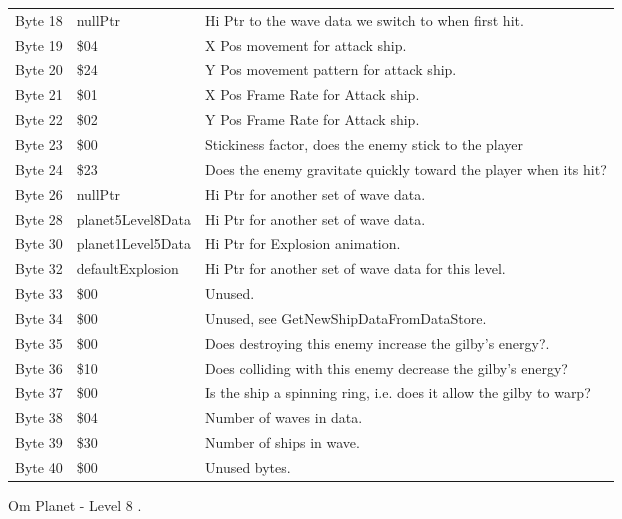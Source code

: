 \begin{figure}[H]
{\begin{adjustbox}{width=12cm}
\begin{tabular}{lll}
 Byte 18 & nullPtr           & Hi Ptr to the wave data we switch to when first hit.               \\
 Byte 19 & \$04               & X Pos movement for attack ship.                                    \\
 Byte 20 & \$24               & Y Pos movement pattern for attack ship.                            \\
 Byte 21 & \$01               & X Pos Frame Rate for Attack ship.                                  \\
 Byte 22 & \$02               & Y Pos Frame Rate for Attack ship.                                  \\
 Byte 23 & \$00               & Stickiness factor, does the enemy stick to the player              \\
 Byte 24 & \$23               & Does the enemy gravitate quickly toward the player when its hit?   \\
 Byte 26 & nullPtr           & Hi Ptr for another set of wave data.                               \\
 Byte 28 & planet5Level8Data & Hi Ptr for another set of wave data.                               \\
 Byte 30 & planet1Level5Data & Hi Ptr for Explosion animation.                                    \\
 Byte 32 & defaultExplosion  & Hi Ptr for another set of wave data for this level.                \\
 Byte 33 & \$00               & Unused.                                                            \\
 Byte 34 & \$00               & Unused, see GetNewShipDataFromDataStore.                           \\
 Byte 35 & \$00               & Does destroying this enemy increase the gilby's energy?.           \\
 Byte 36 & \$10               & Does colliding with this enemy decrease the gilby's energy?        \\
 Byte 37 & \$00               & Is the ship a spinning ring, i.e. does it allow the gilby to warp? \\
 Byte 38 & \$04               & Number of waves in data.                                           \\
 Byte 39 & \$30               & Number of ships in wave.                                           \\
 Byte 40 & \$00               & Unused bytes.                                                      \\
\bottomrule
\end{tabular}

  \end{adjustbox}

  }\caption*{Om Planet - Level 8
.}
\end{figure}

